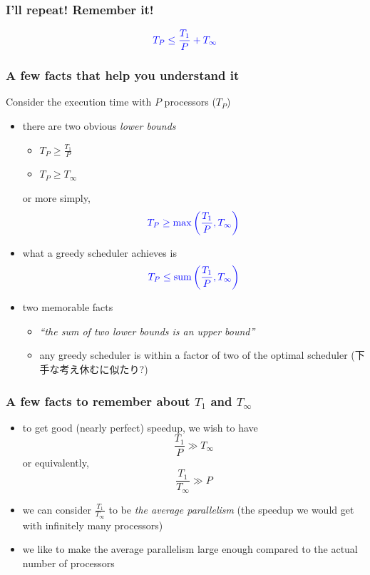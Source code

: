 \documentclass[12pt,dvipdfmx]{beamer}
\newcommand{\ao}[1]{{\color{blue}#1}}
\begin{document}
\begin{frame}
\frametitle{I'll repeat! Remember it!}


{\huge \[ \ao{T_P \leq \frac{T_1}{P} + T_\infty} \]}

\end{frame}


\begin{frame}
\frametitle{A few facts that help you understand it}
Consider the execution time with $P$ processors ($T_P$)
\begin{itemize}
\item there are two obvious {\it lower bounds}
  \begin{itemize}
  \item \ao{$T_P \geq \frac{T_1}{P}$}
  \item \ao{$T_P \geq T_\infty$}
  \end{itemize}
  or more simply,
\[ \ao{T_P \geq \max\left(\frac{T_1}{P}, T_\infty\right)} \]

\item what a greedy scheduler achieves is
  \[ \ao{T_P \leq \mbox{sum}\left(\frac{T_1}{P}, T_\infty\right)} \]
\item two memorable facts
  \begin{itemize}
  \item {\it ``the sum of two lower bounds is an upper bound''}
  \item any greedy scheduler is
    within a factor of two of the optimal scheduler
    (下手な考え休むに似たり?)
  \end{itemize}
\end{itemize}
\end{frame}

\begin{frame}
\frametitle{A few facts to remember about $T_1$ and $T_\infty$}
\begin{itemize}
\item to get good (nearly perfect) speedup, we wish to have
  \[ \frac{T_1}{P} \gg T_\infty \]
  or equivalently, 
  \[ \frac{T_1}{T_\infty} \gg P \]

\item we can consider $\frac{T_1}{T_\infty}$
  to be {\it the average parallelism} (the speedup we would get
  with infinitely many processors)

\item we like to make the average parallelism
  large enough compared to the actual number of processors

\end{itemize}
\end{frame}
\end{document}
